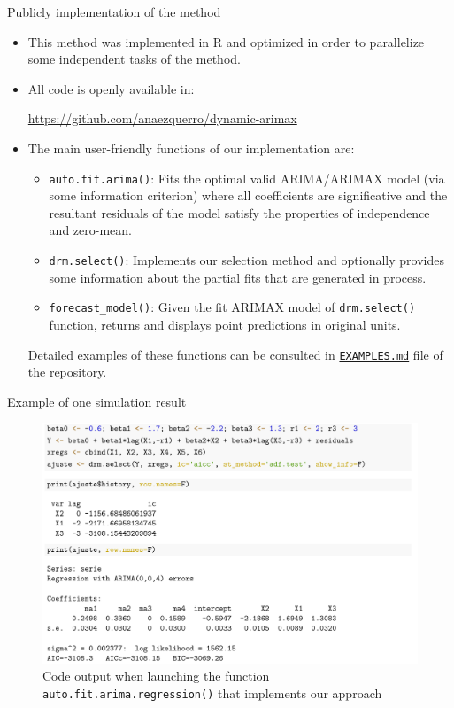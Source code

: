 \documentclass[10pt]{beamer}
\newcommand{\function}[1]{\textcolor{journalred}{\texttt{#1}}}
\begin{document}
\begin{frame}{Publicly implementation of the method}
    \begin{itemize}
        \item This method was implemented in R and optimized in order to parallelize some independent tasks of the method. 
        \item All code is openly available in:
        \begin{center}
            \url{https://github.com/anaezquerro/dynamic-arimax}
        \end{center}
        \item The main user-friendly functions of our implementation are:
        \begin{itemize}
            \item \function{auto.fit.arima()}: Fits the optimal valid ARIMA/ARIMAX model (via some information criterion) where all coefficients are significative and the resultant residuals of the model satisfy the properties of independence and zero-mean.
            \item \function{drm.select()}: Implements our selection method and optionally provides some information about the partial fits that are generated in process.
            \item  \function{forecast\_model()}: Given the fit ARIMAX model of \function{drm.select()} function, returns and displays point predictions in original units.
        \end{itemize}
        Detailed examples of these functions can be consulted in \href{https://github.com/anaezquerro/dynamic-arimax/blob/main/EXAMPLES.md}{\texttt{EXAMPLES.md}} file of the repository.
    \end{itemize}
\end{frame}


\begin{frame}{Example of one simulation result}
    \begin{figure}
        \caption{Code output when launching the function \texttt{auto.fit.arima.regression()} that implements our approach}
        \includegraphics[scale=0.5]{gallery/simulation-example.pdf}
    \end{figure}
    
\end{frame}
\end{document}
